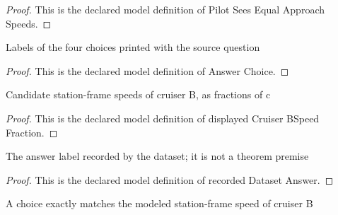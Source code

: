 \begin{proof}
  This is the declared model definition of Pilot Sees Equal Approach Speeds.
\end{proof}
\begin{definition}
  \label{def:physics:phyx-mini-0589:phyxminiproblems-problemphyxmini0589-answerchoice}
  Labels of the four choices printed with the source question
\end{definition}
\begin{proof}
  This is the declared model definition of Answer Choice.
\end{proof}
\begin{definition}
  \label{def:physics:phyx-mini-0589:phyxminiproblems-problemphyxmini0589-displayedcruiserbspeedfraction}
  Candidate station-frame speeds of cruiser B, as fractions of c
\end{definition}
\begin{proof}
  This is the declared model definition of displayed Cruiser BSpeed Fraction.
\end{proof}
\begin{definition}
  \label{def:physics:phyx-mini-0589:phyxminiproblems-problemphyxmini0589-recordeddatasetanswer}
  The answer label recorded by the dataset; it is not a theorem premise
\end{definition}
\begin{proof}
  This is the declared model definition of recorded Dataset Answer.
\end{proof}
\begin{definition}
  \label{def:physics:phyx-mini-0589:phyxminiproblems-problemphyxmini0589-matchesanswerchoice}
  A choice exactly matches the modeled station-frame speed of cruiser B
\end{definition}
